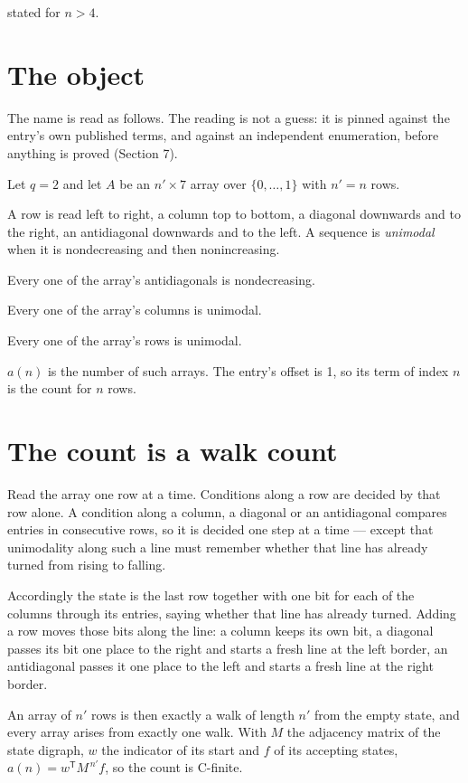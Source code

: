 \documentclass[11pt]{article}
\theoremstyle{definition}
\begin{document}
stated for $n > 4$.

\section{The object}

The name is read as follows. The reading is not a guess: it is pinned against the entry's own published terms, and against an independent enumeration, before anything is proved (Section 7).

Let $q = 2$ and let $A$ be an $n' \times 7$ array over $\{0,\dots,1\}$ with $n' = n$ rows.

A row is read left to right, a column top to bottom, a diagonal downwards and to the right, an antidiagonal downwards and to the left. A sequence is {\itshape unimodal} when it is nondecreasing and then nonincreasing.

Every one of the array's antidiagonals is nondecreasing.

Every one of the array's columns is unimodal.

Every one of the array's rows is unimodal.

$a(n)$ is the number of such arrays. The entry's offset is 1, so its term of index $n$ is the count for $n$ rows.

\section{The count is a walk count}

Read the array one row at a time. Conditions along a row are decided by that row alone. A condition along a column, a diagonal or an antidiagonal compares entries in consecutive rows, so it is decided one step at a time --- except that unimodality along such a line must remember whether that line has already turned from rising to falling.

Accordingly the state is the last row together with one bit for each of the columns through its entries, saying whether that line has already turned. Adding a row moves those bits along the line: a column keeps its own bit, a diagonal passes its bit one place to the right and starts a fresh line at the left border, an antidiagonal passes it one place to the left and starts a fresh line at the right border.

An array of $n'$ rows is then exactly a walk of length $n'$ from the empty state, and every array arises from exactly one walk. With $M$ the adjacency matrix of the state digraph, $w$ the indicator of its start and $f$ of its accepting states, $a(n) = w^{\mathsf T}M^{\,n'}f$, so the count is C-finite.
\end{document}
